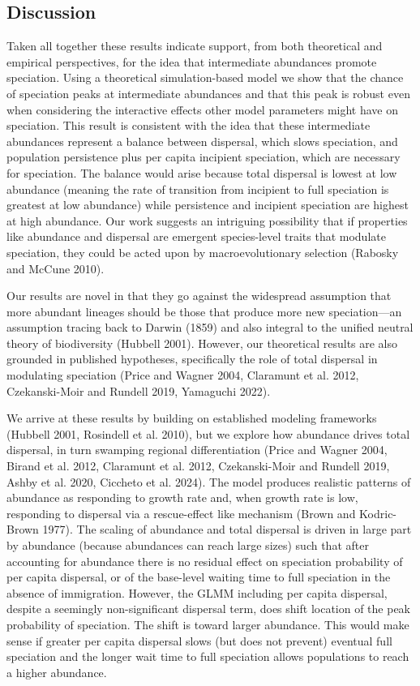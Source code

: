 \documentclass[
  letterpaper,
  DIV=11,
  numbers=noendperiod]{scrartcl}
\begin{document}
\subsection{Discussion}\label{discussion}

Taken all together these results indicate support, from both theoretical
and empirical perspectives, for the idea that intermediate abundances
promote speciation. Using a theoretical simulation-based model we show
that the chance of speciation peaks at intermediate abundances and that
this peak is robust even when considering the interactive effects other
model parameters might have on speciation. This result is consistent
with the idea that these intermediate abundances represent a balance
between dispersal, which slows speciation, and population persistence
plus per capita incipient speciation, which are necessary for
speciation. The balance would arise because total dispersal is lowest at
low abundance (meaning the rate of transition from incipient to full
speciation is greatest at low abundance) while persistence and incipient
speciation are highest at high abundance. Our work suggests an
intriguing possibility that if properties like abundance and dispersal
are emergent species-level traits that modulate speciation, they could
be acted upon by macroevolutionary selection (Rabosky and McCune 2010).

Our results are novel in that they go against the widespread assumption
that more abundant lineages should be those that produce more new
speciation---an assumption tracing back to Darwin (1859) and also
integral to the unified neutral theory of biodiversity (Hubbell 2001).
However, our theoretical results are also grounded in published
hypotheses, specifically the role of total dispersal in modulating
speciation (Price and Wagner 2004, Claramunt et al. 2012, Czekanski-Moir
and Rundell 2019, Yamaguchi 2022).

We arrive at these results by building on established modeling
frameworks (Hubbell 2001, Rosindell et al. 2010), but we explore how
abundance drives total dispersal, in turn swamping regional
differentiation (Price and Wagner 2004, Birand et al. 2012, Claramunt et
al. 2012, Czekanski-Moir and Rundell 2019, Ashby et al. 2020, Ciccheto
et al. 2024). The model produces realistic patterns of abundance as
responding to growth rate and, when growth rate is low, responding to
dispersal via a rescue-effect like mechanism (Brown and Kodric-Brown
1977). The scaling of abundance and total dispersal is driven in large
part by abundance (because abundances can reach large sizes) such that
after accounting for abundance there is no residual effect on speciation
probability of per capita dispersal, or of the base-level waiting time
to full speciation in the absence of immigration. However, the GLMM
including per capita dispersal, despite a seemingly non-significant
dispersal term, does shift location of the peak probability of
speciation. The shift is toward larger abundance. This would make sense
if greater per capita dispersal slows (but does not prevent) eventual
full speciation and the longer wait time to full speciation allows
populations to reach a higher abundance.
\end{document}

